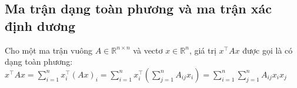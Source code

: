\subsection{Ma trận dạng toàn phương và ma trận xác định dương}
Cho một ma trận vuông $A \in \mathbb{R}^{n \times n}$ và vectơ $x \in \mathbb{R}^n$, giá trị $x^\top Ax$ được gọi là có dạng toàn phương:\\

$x^\top Ax =\sum_{i=1}^{n}x^\top_i (Ax)_i
=\sum_{i=1}^{n}x^\top_i (\sum_{j=1}^{n}A_{ij}x_i)
=\sum_{i=1}^{n}\sum_{j=1}^{n}A_{ij}x_ix_j
$

